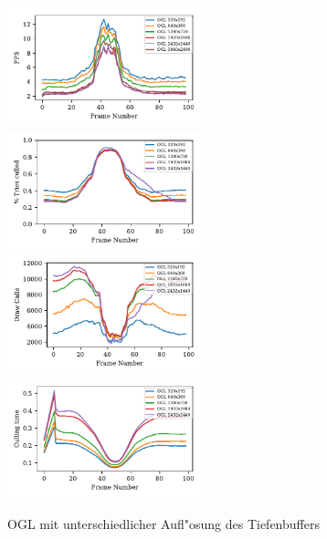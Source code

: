 \documentclass[journal]{vgtc}
\begin{document}
\begin{figure}
	\begin{minipage}{0.5\textwidth}
		\includegraphics[width=0.5\textwidth]{images/Evaluation_4_Results_FPS.pdf}
		\includegraphics[width=0.5\textwidth]{images/Evaluation_4_Results_Percentage culled.pdf}
		\includegraphics[width=0.5\textwidth]{images/Evaluation_4_Results_Draw Calls.pdf}
		\includegraphics[width=0.5\textwidth]{images/Evaluation_4_Results_Culling time.pdf}
		\caption{OGL mit unterschiedlicher Aufl"osung des Tiefenbuffers}
		\label{fig:different_resolutions}
	\end{minipage}
\end{figure}
\end{document}
